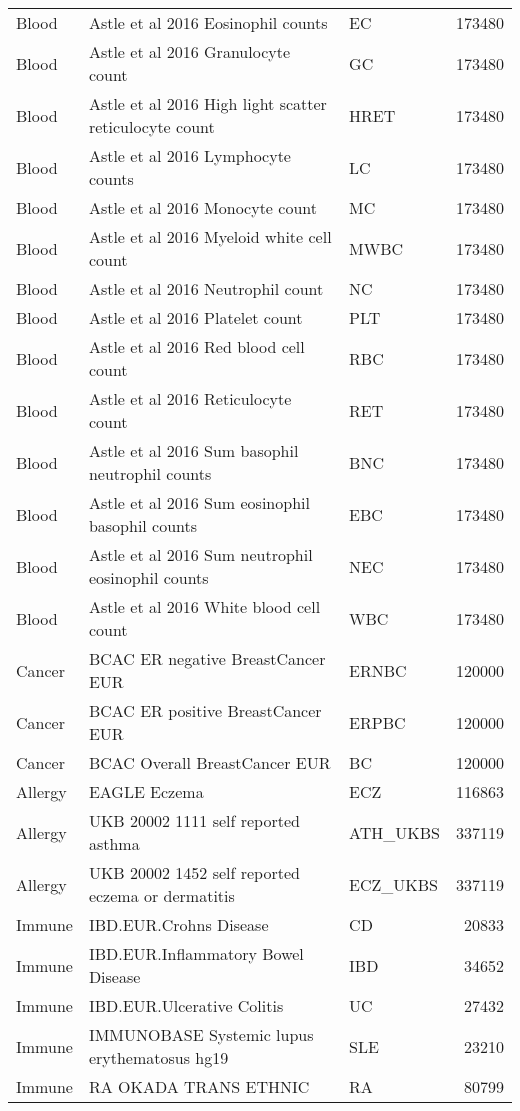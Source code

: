 \begin{table}[ht]
\begin{tabular}{lllr}
  Blood & Astle et al 2016 Eosinophil counts & EC & 173480 \\ 
  Blood & Astle et al 2016 Granulocyte count & GC & 173480 \\ 
  Blood & Astle et al 2016 High light scatter reticulocyte count & HRET & 173480 \\ 
  Blood & Astle et al 2016 Lymphocyte counts & LC & 173480 \\ 
  Blood & Astle et al 2016 Monocyte count & MC & 173480 \\ 
  Blood & Astle et al 2016 Myeloid white cell count & MWBC & 173480 \\ 
  Blood & Astle et al 2016 Neutrophil count & NC & 173480 \\ 
  Blood & Astle et al 2016 Platelet count & PLT & 173480 \\ 
  Blood & Astle et al 2016 Red blood cell count & RBC & 173480 \\ 
  Blood & Astle et al 2016 Reticulocyte count & RET & 173480 \\ 
  Blood & Astle et al 2016 Sum basophil neutrophil counts & BNC & 173480 \\ 
  Blood & Astle et al 2016 Sum eosinophil basophil counts & EBC & 173480 \\ 
  Blood & Astle et al 2016 Sum neutrophil eosinophil counts & NEC & 173480 \\ 
  Blood & Astle et al 2016 White blood cell count & WBC & 173480 \\ 
  Cancer & BCAC ER negative BreastCancer EUR & ERNBC & 120000 \\ 
  Cancer & BCAC ER positive BreastCancer EUR & ERPBC & 120000 \\ 
  Cancer & BCAC Overall BreastCancer EUR & BC & 120000 \\ 
  Allergy & EAGLE Eczema & ECZ & 116863 \\ 
  Allergy & UKB 20002 1111 self reported asthma & ATH\_UKBS & 337119 \\ 
  Allergy & UKB 20002 1452 self reported eczema or dermatitis & ECZ\_UKBS & 337119 \\ 
  Immune & IBD.EUR.Crohns Disease & CD & 20833 \\ 
  Immune & IBD.EUR.Inflammatory Bowel Disease & IBD & 34652 \\ 
  Immune & IBD.EUR.Ulcerative Colitis & UC & 27432 \\ 
  Immune & IMMUNOBASE Systemic lupus erythematosus hg19 & SLE & 23210 \\ 
  Immune & RA OKADA TRANS ETHNIC & RA & 80799 \\ 

\end{tabular}
\end{table}
